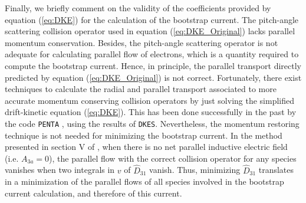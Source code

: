 \documentclass[10pt]{iopart}
\newcommand{\DKES}{{\texttt{DKES}}}
\begin{document}
Finally, we briefly comment on the validity of the coefficients provided by equation (\ref{eq:DKE}) for the calculation of the bootstrap current. The pitch-angle scattering collision operator used in equation (\ref{eq:DKE_Original}) lacks parallel momentum conservation. Besides, the pitch-angle scattering operator is not adequate for calculating parallel flow of electrons, which is a quantity required to compute the bootstrap current. Hence, in principle, the parallel transport directly predicted by equation (\ref{eq:DKE_Original}) is not correct. Fortunately, there exist techniques  \cite{Taguchi,Sugama-PENTA,Sugama2008,MaasbergMomentumCorrection} to calculate the radial and parallel transport associated to more accurate momentum conserving collision operators by just solving the simplified drift-kinetic equation (\ref{eq:DKE}). This has been done successfully in the past by the code \texttt{PENTA} \cite{Sugama-PENTA, Spong-PENTA}, using the results of {\DKES}. Nevertheless, the momentum restoring technique is not needed for minimizing the bootstrap current. In the method presented in section V of \cite{MaasbergMomentumCorrection}, when there is no net parallel inductive electric field (i.e. $A_{3a}=0$), the parallel flow with the correct collision operator for any species vanishes when two integrals in $v$ of $\widehat{D}_{31}$ vanish. Thus, minimizing $\widehat{D}_{31}$ translates in a minimization of the parallel flows of all species involved in the bootstrap current calculation, and therefore of this current.  
%
\end{document}
